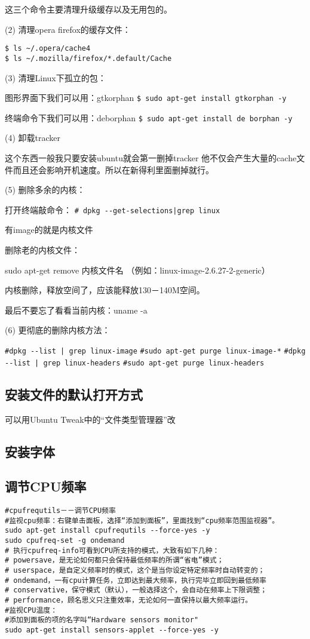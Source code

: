 这三个命令主要清理升级缓存以及无用包的。

(2) 清理opera firefox的缓存文件：
\begin{verbatim}
$ ls ~/.opera/cache4
$ ls ~/.mozilla/firefox/*.default/Cache
\end{verbatim}

(3) 清理Linux下孤立的包：

图形界面下我们可以用：gtkorphan
\verb"$ sudo apt-get install gtkorphan -y"

终端命令下我们可以用：deborphan
\verb"$ sudo apt-get install de borphan -y"

(4) 卸载tracker

这个东西一般我只要安装ubuntu就会第一删掉tracker 他不仅会产生大量的cache文件而且还会影响开机速度。所以在新得利里面删掉就行。

(5) 删除多余的内核：

打开终端敲命令：
\verb"# dpkg --get-selections|grep linux"

有image的就是内核文件

删除老的内核文件：

sudo apt-get remove 内核文件名 （例如：linux-image-2.6.27-2-generic）

内核删除，释放空间了，应该能释放130－140M空间。

最后不要忘了看看当前内核：uname -a

(6) 更彻底的删除内核方法：

\verb"#dpkg --list | grep linux-image"
\verb"#sudo apt-get purge linux-image-*"
\verb"#dpkg --list | grep linux-headers"
\verb"#sudo apt-get purge linux-headers"

\subsection{安装文件的默认打开方式}
可以用Ubuntu Tweak中的“文件类型管理器”改

\subsection{安装字体}

\subsection{调节CPU频率}
\begin{verbatim}
#cpufrequtils－－调节CPU频率
#监视cpu频率：右键单击面板，选择“添加到面板”，里面找到“cpu频率范围监视器”。
sudo apt-get install cpufrequtils --force-yes -y
sudo cpufreq-set -g ondemand
# 执行cpufreq-info可看到CPU所支持的模式，大致有如下几种：
# powersave，是无论如何都只会保持最低频率的所谓“省电”模式；
# userspace，是自定义频率时的模式，这个是当你设定特定频率时自动转变的；
# ondemand，一有cpu计算任务，立即达到最大频率，执行完毕立即回到最低频率
# conservative，保守模式（默认），一般选择这个，会自动在频率上下限调整；
# performance，顾名思义只注重效率，无论如何一直保持以最大频率运行。 
#监视CPU温度：
#添加到面板的项的名字叫“Hardware sensors monitor"
sudo apt-get install sensors-applet --force-yes -y
\end{verbatim}

